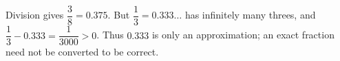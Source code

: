 Division gives $\boxed{\dfrac{3}{8}=0.375}$. But $\dfrac{1}{3}=0.333\ldots$ has infinitely many threes, and $\dfrac{1}{3}-0.333=\dfrac{1}{3000}>0$. Thus $0.333$ is only an approximation; an exact fraction need not be converted to be correct.
